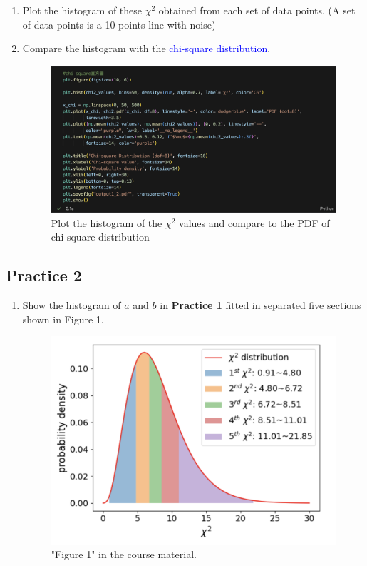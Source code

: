 \documentclass[12pt,a4paper]{article}
\begin{document}
\begin{CJK}{UTF8}{bkai}
\begin{enumerate}
    \clearpage
    \item Plot the histogram of these $\chi^2$ obtained from each set of data points. (A set of data points is a 10 points line with noise)
    
    \item Compare the histogram with the \textcolor{blue}{chi-square distribution}.
    \begin{figure}[h]
        \centering
        \includegraphics[width=1\linewidth]{figures/code/practice_1/code_1_5.png}
        \caption{Plot the histogram of the $\chi^2$ values and compare to the PDF of chi-square distribution}
        \label{fig:code_1_5}
    \end{figure}
    
\end{enumerate}

\clearpage
\subsection{Practice 2}
\hfill



\begin{enumerate}
    \item Show the histogram of $a$ and $b$ in \textbf{Practice 1} fitted in separated five sections shown in Figure 1.
    \begin{figure}[h]
        \centering
        \includegraphics[width=0.85\linewidth]{figures/code/practice_2/fig1.png}
        \caption{"Figure 1" in the course material.}
        \label{fig:fig1}
    \end{figure}
    

\end{enumerate}
\end{CJK}
\end{document}
